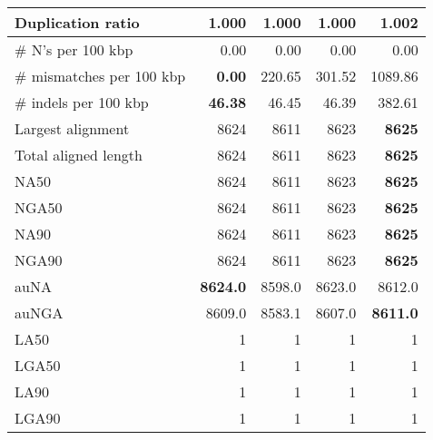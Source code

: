 \documentclass[12pt,a4paper]{article}
\begin{document}
\begin{table}[ht]
\begin{center}
\begin{tabular}{|l*{4}{|r}|}
Duplication ratio & {\bf 1.000} & {\bf 1.000} & {\bf 1.000} & 1.002 \\ \hline
\# N's per 100 kbp & 0.00 & 0.00 & 0.00 & 0.00 \\ \hline
\# mismatches per 100 kbp & {\bf 0.00} & 220.65 & 301.52 & 1089.86 \\ \hline
\# indels per 100 kbp & {\bf 46.38} & 46.45 & 46.39 & 382.61 \\ \hline
Largest alignment & 8624 & 8611 & 8623 & {\bf 8625} \\ \hline
Total aligned length & 8624 & 8611 & 8623 & {\bf 8625} \\ \hline
NA50 & 8624 & 8611 & 8623 & {\bf 8625} \\ \hline
NGA50 & 8624 & 8611 & 8623 & {\bf 8625} \\ \hline
NA90 & 8624 & 8611 & 8623 & {\bf 8625} \\ \hline
NGA90 & 8624 & 8611 & 8623 & {\bf 8625} \\ \hline
auNA & {\bf 8624.0} & 8598.0 & 8623.0 & 8612.0 \\ \hline
auNGA & 8609.0 & 8583.1 & 8607.0 & {\bf 8611.0} \\ \hline
LA50 & 1 & 1 & 1 & 1 \\ \hline
LGA50 & 1 & 1 & 1 & 1 \\ \hline
LA90 & 1 & 1 & 1 & 1 \\ \hline
LGA90 & 1 & 1 & 1 & 1 \\ \hline
\end{tabular}
\end{center}
\end{table}
\end{document}
